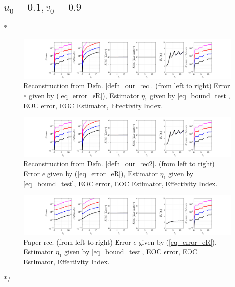 \documentclass[12pt,a4paper]{article}
\numberwithin{equation}{section}
\theoremstyle{definition}
\begin{document}
\subsection*{$u_0=0.1, v_0= 0.9$}
\/*
\begin{figure}[H]
	\hspace{-3cm}
	\includegraphics[scale=0.55]{fig_LeapFrogplots_1x5_sin_IC_harmonic_order_2_u1_v9_rec_george}	
	\caption{Reconstruction from Defn. \ref{defn_our_rec}. (from left to right) Error $e$ given by (\ref{eq_error_eR}), Estimator $\eta_1$ given by \ref{eq_bound_test},  EOC error, EOC Estimator, Effectivity Index.}
	\label{fig_all_in_one_our_rec_george_u1_v9}
\end{figure}

\begin{figure}[H]
	\hspace{-3cm}
	\includegraphics[scale=0.55]{fig_LeapFrogplots_1x5_sin_IC_harmonic_order_2_u1_v9_rec2}	
	\caption{Reconstruction from Defn. \ref{defn_our_rec2}. (from left to right) Error $e$ given by (\ref{eq_error_eR}), Estimator $\eta_1$ given by \ref{eq_bound_test},  EOC error, EOC Estimator, Effectivity Index.}
	\label{fig_all_in_one_our_rec_2_u1_v9}
\end{figure}
\begin{figure}[H]
	\hspace{-3cm}
	\includegraphics[scale=0.55]{fig_LeapFrogplots_1x5_sin_IC_harmonic_u1_v9_paperrec}	
	\caption{Paper rec. (from left to right) Error $e$ given by (\ref{eq_error_eR}), Estimator $\eta_1$ given by \ref{eq_bound_test},  EOC error, EOC Estimator, Effectivity Index.}
	\label{fig_all_in_one_paperrec_u01_v09}
\end{figure}
*/
\end{document}
